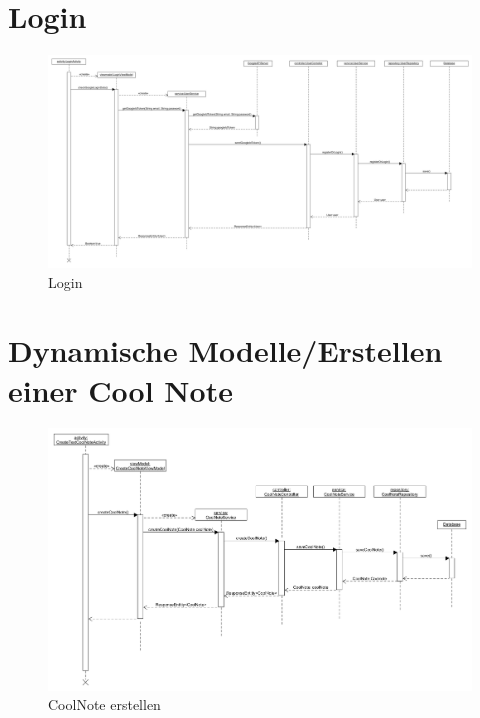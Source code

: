 \documentclass[a4paper]{scrreprt}
\begin{document}
		\section{Login}
		 \begin{figure}[H]
	       \centering
	       \includegraphics[angle=90,scale = .28]{login_sequenzdiagramm.png}
	       \caption{Login}
	      \end{figure}
	      
	      	
	 
	 
		\section{Dynamische Modelle/Erstellen einer Cool Note}
		 \begin{figure}[H]
	       \centering
	       \includegraphics[scale = .35]{SD_CoolNote_erstellen.png}
	       \caption{CoolNote erstellen}
	      \end{figure}
	      
	      
	      	
		
	      
\end{document}
